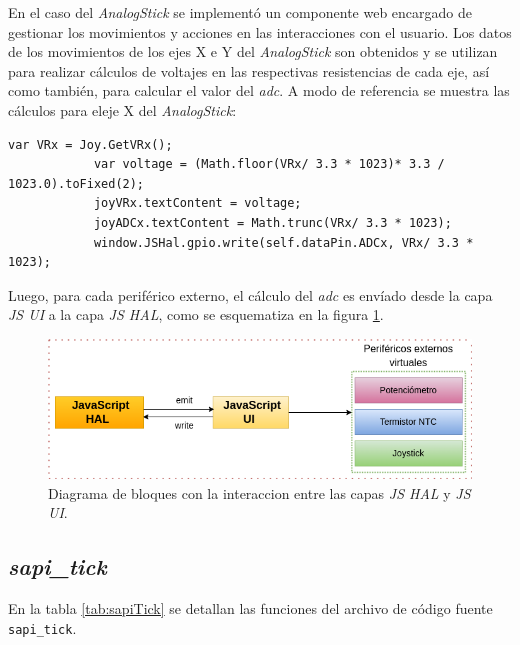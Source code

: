 En el caso del \textit{AnalogStick} se implementó un componente web encargado de gestionar los movimientos y acciones en las interacciones con el usuario. Los datos de los movimientos de los ejes X e Y del \textit{AnalogStick} son obtenidos y se utilizan para realizar cálculos de voltajes en las respectivas resistencias de cada eje, así como también, para calcular el valor del \textit{adc}. A modo de referencia se muestra las cálculos para eleje X del \textit{AnalogStick}:

\begin{lstlisting}[caption={Cálculo de la resistencia del eje X y del ADC.}]
            var VRx = Joy.GetVRx();
            var voltage = (Math.floor(VRx/ 3.3 * 1023)* 3.3 / 1023.0).toFixed(2);
            joyVRx.textContent = voltage;
            joyADCx.textContent = Math.trunc(VRx/ 3.3 * 1023);
            window.JSHal.gpio.write(self.dataPin.ADCx, VRx/ 3.3 * 1023);
\end{lstlisting}

Luego, para cada periférico externo, el cálculo del \textit{adc} es envíado desde la capa \textit{JS UI} a la capa \textit{JS HAL}, como se esquematiza en la figura \ref{fig:uiADC}.

\begin{figure}[ht]
	\centering
	\includegraphics[scale=.57]{./Figures/uiADC.png}
	\caption{Diagrama de bloques con la interaccion entre las capas \textit{JS HAL} y \textit{JS UI}.}
	\label{fig:uiADC}
\end{figure}

\newpage
\subsection{\textit{\textbf{sapi\_tick}}}
\label{sec:sapi_tick}

En la tabla \ref{tab:sapiTick} se detallan las funciones del archivo de código fuente \texttt{sapi\_tick}.

